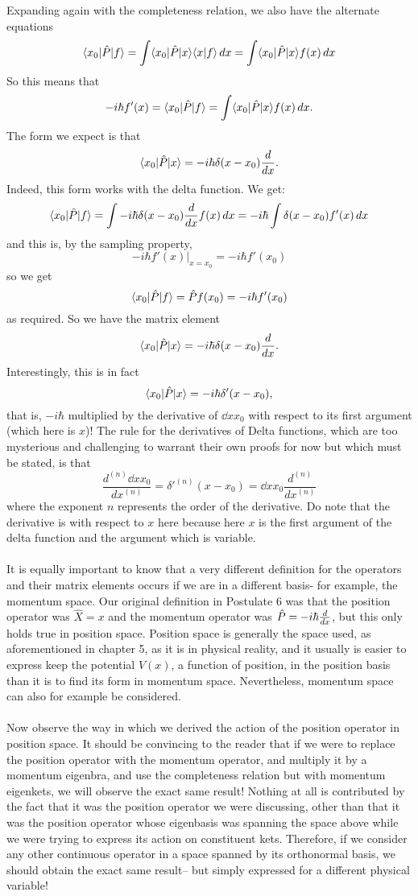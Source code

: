 Expanding again with the completeness relation, we also have the alternate equations
$$
\langle x_{0}|\hat{P}|f\rangle=\int\langle x_{0}|\hat{P}|x\rangle\langle x|f\rangle\,dx=\int\langle x_{0}|\hat{P}|x\rangle f(x)\,dx
$$
So this means that
$$
-i\hbar f'(x)=\langle x_{0}|\hat{P}|f\rangle=\int\langle x_{0}|\hat{P}|x\rangle f(x)\,dx.
$$
The form we expect is that 
$$
\langle x_{0}|\hat{P}|x\rangle=-i\hbar\delta(x-x_{0})\frac{d}{d x}.
$$
Indeed, this form works with the delta function. We get:
$$
\langle x_{0}|\hat{P}|f\rangle=\int-i\hbar\delta(x-x_{0})\frac{d}{d x}f(x)\,dx=-i\hbar\int\delta(x-x_{0})f'(x)\,dx
$$
and this is, by the sampling property,
$$
-i\hbar f'(x)\biggl\vert_{x=x_{0}}=-i\hbar f'(x_{0})
$$
so we get 
$$
\langle x_{0}|\hat{P}|f\rangle=\hat{P}f(x_{0})=-i\hbar f'(x_{0})
$$
as required. So we have the matrix element 
$$
\langle x_{0}|\hat{P}|x\rangle=-i\hbar\delta(x-x_{0})\frac{d}{d x}.
$$
Interestingly, this is in fact 
$$
\langle x_{0}|\hat{P}|x\rangle=-i\hbar\delta'(x-x_{0}),
$$
that is, $-i\hbar$ multiplied by the derivative of $\dd{x}{x_{0}}$ with respect to its first argument (which here is $x$)! The rule for the derivatives of Delta functions, which are too mysterious and challenging to warrant their own proofs for now but which must be stated, is that 
$$
\frac{d^{(n)}\dd{x}{x_{0}}}{dx^{(n)}}=\delta'^{(n)}(x-x_{0})=\dd{x}{x_{0}}\frac{d^{(n)}}{dx^{(n)}}
$$
where the exponent $n$ represents the order of the derivative. Do note that the derivative is with respect to $x$ here because here $x$ is the first argument of the delta function and the argument which is variable. 
\\\\
It is equally important to know that a very different definition for the operators and their matrix elements occurs if we are in a different basis- for example, the momentum space. Our original definition in Postulate 6 was that the position operator was $\hat{X}=x$ and the momentum operator was $\hat{P}=-i\hbar\frac{d}{d x}$, but this only holds true in position space. Position space is generally the space used, as aforementioned in chapter 5, as it is in physical reality, and it usually is easier to express keep the potential $V(x)$, a function of position, in the position basis than it is to find its form in momentum space. Nevertheless, momentum space can also for example be considered.
\\\\
Now observe the way in which we derived the action of the position operator in position space. It should be convincing to the reader that if we were to replace the position operator with the momentum operator, and multiply it by a momentum eigenbra, and use the completeness relation but with momentum eigenkets, we will observe the exact same result! Nothing at all is contributed by the fact that it was the position operator we were discussing, other than that it was the position operator whose eigenbasis was spanning the space above while we were trying to express its action on constituent kets. Therefore, if we consider any other continuous operator in a space spanned by its orthonormal basis, we should obtain the exact same result-- but simply expressed for a different physical variable!
